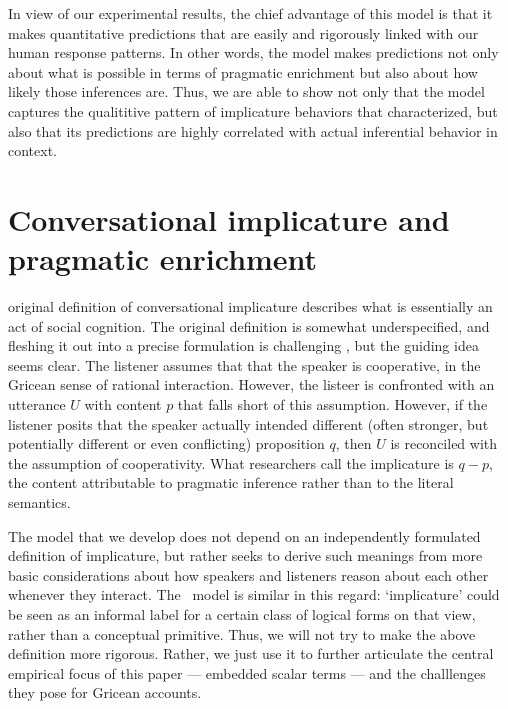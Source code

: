 \documentclass{article}
\begin{document}
In view of our experimental results, the chief advantage of this model
is that it makes quantitative predictions that are easily and
rigorously linked with our human response patterns.  In other words,
the model makes predictions not only about what is possible in terms
of pragmatic enrichment but also about how likely those inferences
are. Thus, we are able to show not only that the model captures the
qualititive pattern of implicature behaviors that
\citeauthor{Chemla:Spector:2011} characterized, but also that its
predictions are highly correlated with actual inferential behavior in
context.



\section{Conversational implicature and pragmatic enrichment }\label{sec:implicature}

 original definition of conversational implicature
describes what is essentially an act of social cognition. The original
definition is somewhat underspecified, and fleshing it out into a
precise formulation is challenging \citep{Hirschberg85}, but the
guiding idea seems clear.  The listener assumes that that the speaker
is cooperative, in the Gricean sense of rational interaction. However,
the listeer is confronted with an utterance $U$ with content $p$ that
falls short of this assumption. However, if the listener posits that
the speaker actually intended different (often stronger, but
potentially different or even conflicting) proposition $q$, then $U$
is reconciled with the assumption of cooperativity. What researchers
call the implicature is $q - p$, the content attributable to pragmatic
inference rather than to the literal semantics.

The model that we develop does not depend on an independently
formulated definition of implicature, but rather seeks to derive such
meanings from more basic considerations about how speakers and
listeners reason about each other whenever they interact. The \CFS\
model is similar in this regard: `implicature' could be seen as an
informal label for a certain class of logical forms on that view,
rather than a conceptual primitive. Thus, we will not try to make the
above definition more rigorous. Rather, we just use it to further
articulate the central empirical focus of this paper --- embedded
scalar terms --- and the challlenges they pose for Gricean accounts.
\end{document}
